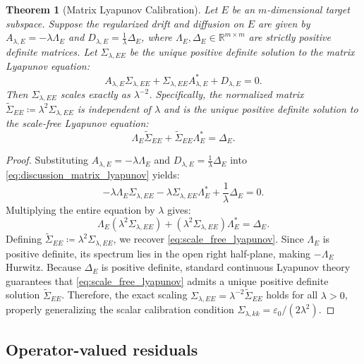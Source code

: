\documentclass[11pt]{amsart}
\theoremstyle{plain}
\newtheorem{theorem}{Theorem}
\theoremstyle{definition}
\theoremstyle{remark}
\begin{document}
\begin{theorem}[Matrix Lyapunov Calibration]
  \label{thm:matrix_lyapunov}
  Let $E$ be an $m$-dimensional target subspace. Suppose the regularized drift and diffusion on $E$ are given by $A_{\lambda,E} = -\lambda \Lambda_E$ and $D_{\lambda,E} = \frac{1}{\lambda} \Delta_E$, where $\Lambda_E, \Delta_E \in \mathbb{R}^{m \times m}$ are strictly positive definite matrices. Let $\Sigma_{\lambda,EE}$ be the unique positive definite solution to the matrix Lyapunov equation:
  \begin{equation}
    \label{eq:discussion_matrix_lyapunov}
    A_{\lambda,E}\Sigma_{\lambda,EE}
    +\Sigma_{\lambda,EE}A_{\lambda,E}^{*}
    +D_{\lambda,E}=0.
  \end{equation}
  Then $\Sigma_{\lambda,EE}$ scales exactly as $\lambda^{-2}$. Specifically, the normalized matrix $\widetilde{\Sigma}_{EE} \coloneqq \lambda^2 \Sigma_{\lambda,EE}$ is independent of $\lambda$ and is the unique positive definite solution to the scale-free Lyapunov equation:
  \begin{equation}
    \label{eq:scale_free_lyapunov}
    \Lambda_E \widetilde{\Sigma}_{EE} + \widetilde{\Sigma}_{EE} \Lambda_E^* = \Delta_E.
  \end{equation}
\end{theorem}
\begin{proof}
  Substituting $A_{\lambda,E} = -\lambda \Lambda_E$ and $D_{\lambda,E} = \frac{1}{\lambda} \Delta_E$ into \eqref{eq:discussion_matrix_lyapunov} yields:
  \[
    -\lambda \Lambda_E \Sigma_{\lambda,EE} - \lambda \Sigma_{\lambda,EE} \Lambda_E^* + \frac{1}{\lambda} \Delta_E = 0.
  \]
  Multiplying the entire equation by $\lambda$ gives:
  \[
    \Lambda_E (\lambda^2 \Sigma_{\lambda,EE}) + (\lambda^2 \Sigma_{\lambda,EE}) \Lambda_E^* = \Delta_E.
  \]
  Defining $\widetilde{\Sigma}_{EE} \coloneqq \lambda^2 \Sigma_{\lambda,EE}$, we recover \eqref{eq:scale_free_lyapunov}. Since $\Lambda_E$ is positive definite, its spectrum lies in the open right half-plane, making $-\Lambda_E$ Hurwitz. Because $\Delta_E$ is positive definite, standard continuous Lyapunov theory guarantees that \eqref{eq:scale_free_lyapunov} admits a unique positive definite solution $\widetilde{\Sigma}_{EE}$. Therefore, the exact scaling $\Sigma_{\lambda,EE} = \lambda^{-2} \widetilde{\Sigma}_{EE}$ holds for all $\lambda > 0$, properly generalizing the scalar calibration condition $\Sigma_{\lambda,kk} = \varepsilon_0 / (2\lambda^2)$.
\end{proof}

\subsection{Operator-valued residuals}
\label{sec:discussion:operator-valued-residuals}
\end{document}
